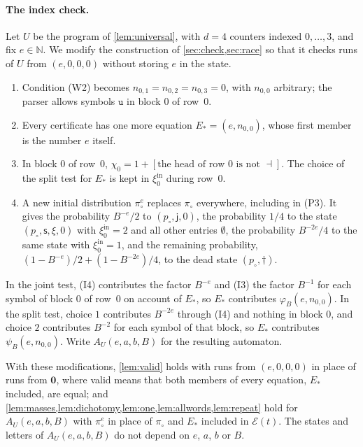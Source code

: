 \documentclass[11pt]{article}
\theoremstyle{plain}
\theoremstyle{definition}
\theoremstyle{remark}
\newcommand{\N}{\mathbb N}
\newcommand{\jt}{\mathsf{j}}
\newcommand{\spl}{\mathsf{s}}
\newcommand{\dead}{\dagger}
\newcommand{\un}{\mathtt{u}}
\newcommand{\fin}{\dashv}
\newcommand{\pin}{p_{\circ}}
\newcommand{\cE}{\mathcal E}
\begin{document}
\paragraph{The index check.} Let $U$ be the program of \cref{lem:universal}, with $d=4$ counters indexed $0,\dots,3$, and fix $e\in\N$. We modify the construction of \cref{sec:check,sec:race} so that it checks runs of $U$ from $(e,0,0,0)$ without storing $e$ in the state.
\begin{enumerate}[label=(I\arabic*)]
\item Condition (W2) becomes $n_{0,1}=n_{0,2}=n_{0,3}=0$, with $n_{0,0}$ arbitrary; the parser allows symbols $\un$ in block $0$ of row~$0$.
\item Every certificate has one more equation $E_*=(e,n_{0,0})$, whose first member is the number $e$ itself.
\item In block $0$ of row~$0$, $\chi_0=1+[\text{the head of row $0$ is not $\fin$}]$. The choice of the split test for $E_*$ is kept in $\xi^{\mathrm{in}}_0$ during row~$0$.
\item A new initial distribution $\pi_\circ^e$ replaces $\pi_\circ$ everywhere, including in (P3). It gives the probability $B^{-e}/2$ to $(\pin,\jt,0)$, the probability $1/4$ to the state $(\pin,\spl,\xi,0)$ with $\xi^{\mathrm{in}}_0=2$ and all other entries $\emptyset$, the probability $B^{-2e}/4$ to the same state with $\xi^{\mathrm{in}}_0=1$, and the remaining probability, $(1-B^{-e})/2+(1-B^{-2e})/4$, to the dead state $(\pin,\dead)$.
\end{enumerate}
In the joint test, (I4) contributes the factor $B^{-e}$ and (I3) the factor $B^{-1}$ for each symbol of block $0$ of row~$0$ on account of $E_*$, so $E_*$ contributes $\varphi_B(e,n_{0,0})$. In the split test, choice $1$ contributes $B^{-2e}$ through (I4) and nothing in block $0$, and choice $2$ contributes $B^{-2}$ for each symbol of that block, so $E_*$ contributes $\psi_B(e,n_{0,0})$. Write $A_U(e,a,b,B)$ for the resulting automaton.

\begin{lemma}\label{lem:indexcheck}
With these modifications, \cref{lem:valid} holds with runs from $(e,0,0,0)$ in place of runs from $\mathbf 0$, where valid means that both members of every equation, $E_*$ included, are equal; and \cref{lem:masses,lem:dichotomy,lem:one,lem:allwords,lem:repeat} hold for $A_U(e,a,b,B)$ with $\pi_\circ^e$ in place of $\pi_\circ$ and $E_*$ included in $\cE(t)$. The states and letters of $A_U(e,a,b,B)$ do not depend on $e$, $a$, $b$ or $B$.
\end{lemma}
\end{document}
